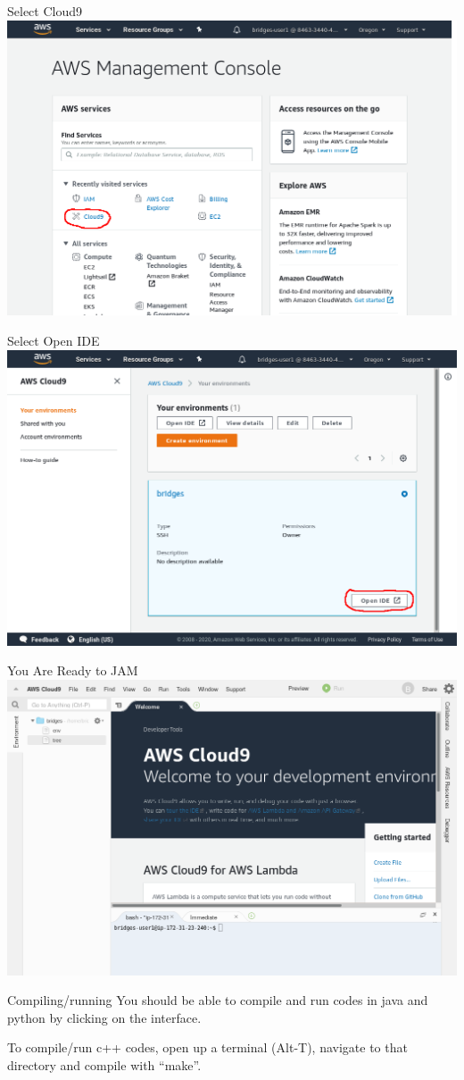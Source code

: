 \documentclass{beamer}
\begin{document}
\begin{frame}{Select Cloud9}
  \includegraphics[width=\linewidth]{cloud9_figures/SelectCloud9.png}
\end{frame}

\begin{frame}{Select Open IDE}
  \includegraphics[width=\linewidth]{cloud9_figures/OpenIDE.png}
\end{frame}

\begin{frame}{You Are Ready to JAM}
  \includegraphics[width=\linewidth]{cloud9_figures/Ready.png}
\end{frame}

\begin{frame}{Compiling/running}
  You should be able to compile and run codes in java and python by clicking on the interface.

  To compile/run c++ codes, open up a terminal (Alt-T), navigate to
  that directory and compile with ``make''.
\end{frame}
\end{document}

